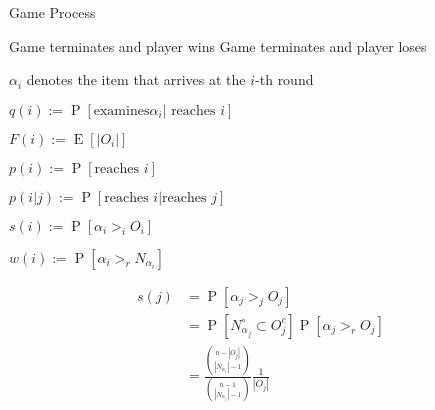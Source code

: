 \documentclass{article}
\newcommand{\oP}{\operatorname{P}}
\newcommand{\expec}{\operatorname{E}}
\newcommand{\gt}{>}
\begin{document}
\begin{algorithm}
\caption{Game Process}
\label{algo1} 
\begin{algorithmic}[1]







			\State Game terminates and player wins
		\Else
			\State Game terminates and player loses
			\EndIf
			
		
	\EndIf
	
	
\EndFor

\end{algorithmic}
\end{algorithm}

\pagebreak

$\alpha_i$ denotes the item that arrives at the $i$-th round

$q(i) := \oP[\text{examines} \alpha_i | \text{ reaches }i]$

$F(i) := \expec[|O_i|]$

$p(i):= \oP[\text{reaches }i]$

$p(i|j):= \oP[\text{reaches }i | \text{reaches }j]$

$s(i) := \oP[\alpha_i \gt_i O_i]$ 

$w(i) := \oP[\alpha_i \gt_r N_{\alpha_i}]$


\begin{align*}
s(j) &= \oP[\alpha_j \gt_j O_j]\\
&= \oP[N_{\alpha_j}^\circ \subset O_j^c]\oP[\alpha_j \gt_r O_j] \\
&= \frac{\binom{n-|O_j|}{|N_{\alpha_j}|-1}}{ \binom{n-1}{|N_{\alpha_j}|-1}} \frac{1}{|O_j|}
\end{align*}
\end{document}
